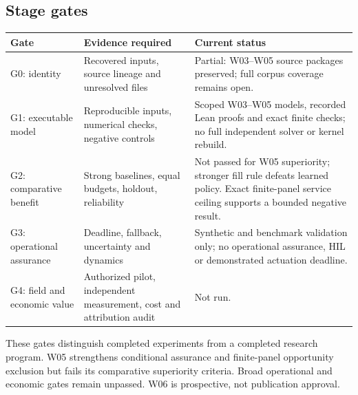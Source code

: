 \documentclass[11pt,letterpaper]{article}
\begin{document}
\subsection{Stage gates}
\begin{longtable}{P{.17\linewidth}P{.44\linewidth}P{.30\linewidth}}
\toprule Gate & Evidence required & Current status\\\midrule\endhead
G0: identity & Recovered inputs, source lineage and unresolved files & Partial: W03--W05 source packages preserved; full corpus coverage remains open.\\
G1: executable model & Reproducible inputs, numerical checks, negative controls & Scoped W03--W05 models, recorded Lean proofs and exact finite checks; no full independent solver or kernel rebuild.\\
G2: comparative benefit & Strong baselines, equal budgets, holdout, reliability & Not passed for W05 superiority; stronger fill rule defeats learned policy. Exact finite-panel service ceiling supports a bounded negative result.\\
G3: operational assurance & Deadline, fallback, uncertainty and dynamics & Synthetic and benchmark validation only; no operational assurance, HIL or demonstrated actuation deadline.\\
G4: field and economic value & Authorized pilot, independent measurement, cost and attribution audit & Not run.\\
\bottomrule
\end{longtable}
These gates distinguish completed experiments from a completed research program. W05 strengthens conditional assurance and finite-panel opportunity exclusion but fails its comparative superiority criteria. Broad operational and economic gates remain unpassed. W06 is prospective, not publication approval.
\end{document}
